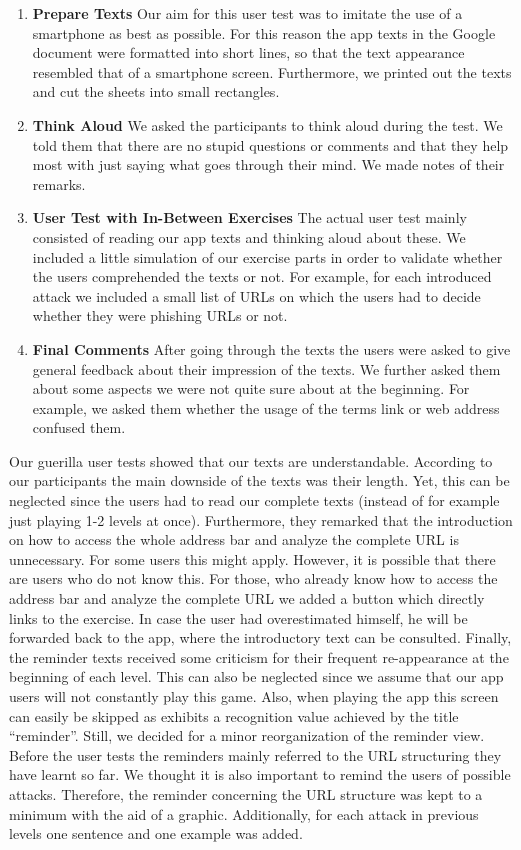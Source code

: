 \begin{enumerate}
	\item\textbf{Prepare Texts} Our aim for this user test was to imitate the use of a smartphone as best as possible.
	For this reason the app texts in the Google document were formatted into short lines, so that the text appearance resembled that of a smartphone screen.
	Furthermore, we printed out the texts and cut the sheets into small rectangles.
	\item\textbf{Think Aloud} We asked the participants to think aloud during the test. 
	We told them that there are no stupid questions or comments and that they help most with just saying what goes through their mind.
	We made notes of their remarks.
	\item\textbf{User Test with In-Between Exercises} The actual user test mainly consisted of reading our app texts and thinking aloud about these.
	We included a little simulation of our exercise parts in order to validate whether the users comprehended the texts or not.
	For example, for each introduced attack we included a small list of URLs on which the users had to decide whether they were phishing URLs or not.
	\item\textbf{Final Comments} After going through the texts the users were asked to give general feedback about their impression of the texts. 
	We further asked them about some aspects we were not quite sure about at the beginning. 
	For example, we asked them whether the usage of the terms link or web address confused them.
\end{enumerate}

Our guerilla user tests showed that our texts are understandable.
According to our participants the main downside of the texts was their length. 
Yet, this can be neglected since the users had to read our complete texts (instead of for example just playing 1-2 levels at once). 
Furthermore, they remarked that the introduction on how to access the whole address bar and analyze the complete URL is unnecessary. 
For some users this might apply. 
However, it is possible that there are users who do not know this. 
For those, who already know how to access the address bar and analyze the complete URL we added a button which directly links to the exercise. 
In case the user had overestimated himself, he will be forwarded back to the app, where the introductory text can be consulted. 
Finally, the reminder texts received some criticism for their frequent re-appearance at the beginning of each level. 
This can also be neglected since we assume that our app users will not constantly play this game. 
Also, when playing the app this screen can easily be skipped as exhibits a recognition value achieved by the title ``reminder''. 
Still, we decided for a minor reorganization of the reminder view. 
Before the user tests the reminders mainly referred to the URL structuring they have learnt so far. 
We thought it is also important to remind the users of possible attacks. 
Therefore, the reminder concerning the URL structure was kept to a minimum with the aid of a graphic. 
Additionally, for each attack in previous levels one sentence and one example was added. 

